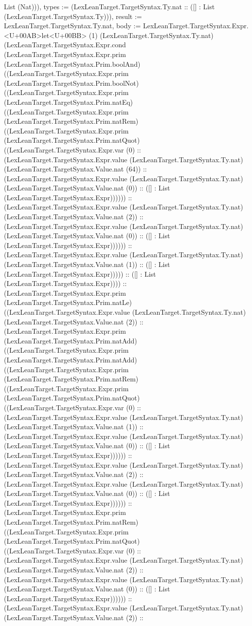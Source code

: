 \documentclass[11pt]{article}
\begin{document}
List (Nat))), types := (LexLeanTarget.TargetSyntax.Ty.nat :: ([] : List (LexLeanTarget.TargetSyntax.Ty))), result := LexLeanTarget.TargetSyntax.Ty.nat, body := LexLeanTarget.TargetSyntax.Expr.<U+00AB>let<U+00BB> (1) (LexLeanTarget.TargetSyntax.Ty.nat) (LexLeanTarget.TargetSyntax.Expr.cond (LexLeanTarget.TargetSyntax.Expr.prim (LexLeanTarget.TargetSyntax.Prim.boolAnd) ((LexLeanTarget.TargetSyntax.Expr.prim (LexLeanTarget.TargetSyntax.Prim.boolNot) ((LexLeanTarget.TargetSyntax.Expr.prim (LexLeanTarget.TargetSyntax.Prim.natEq) ((LexLeanTarget.TargetSyntax.Expr.prim (LexLeanTarget.TargetSyntax.Prim.natRem) ((LexLeanTarget.TargetSyntax.Expr.prim (LexLeanTarget.TargetSyntax.Prim.natQuot) ((LexLeanTarget.TargetSyntax.Expr.var (0) :: (LexLeanTarget.TargetSyntax.Expr.value (LexLeanTarget.TargetSyntax.Ty.nat) (LexLeanTarget.TargetSyntax.Value.nat (64)) :: (LexLeanTarget.TargetSyntax.Expr.value (LexLeanTarget.TargetSyntax.Ty.nat) (LexLeanTarget.TargetSyntax.Value.nat (0)) :: ([] : List (LexLeanTarget.TargetSyntax.Expr)))))) :: (LexLeanTarget.TargetSyntax.Expr.value (LexLeanTarget.TargetSyntax.Ty.nat) (LexLeanTarget.TargetSyntax.Value.nat (2)) :: (LexLeanTarget.TargetSyntax.Expr.value (LexLeanTarget.TargetSyntax.Ty.nat) (LexLeanTarget.TargetSyntax.Value.nat (0)) :: ([] : List (LexLeanTarget.TargetSyntax.Expr)))))) :: (LexLeanTarget.TargetSyntax.Expr.value (LexLeanTarget.TargetSyntax.Ty.nat) (LexLeanTarget.TargetSyntax.Value.nat (1)) :: ([] : List (LexLeanTarget.TargetSyntax.Expr))))) :: ([] : List (LexLeanTarget.TargetSyntax.Expr)))) :: (LexLeanTarget.TargetSyntax.Expr.prim (LexLeanTarget.TargetSyntax.Prim.natLe) ((LexLeanTarget.TargetSyntax.Expr.value (LexLeanTarget.TargetSyntax.Ty.nat) (LexLeanTarget.TargetSyntax.Value.nat (2)) :: (LexLeanTarget.TargetSyntax.Expr.prim (LexLeanTarget.TargetSyntax.Prim.natAdd) ((LexLeanTarget.TargetSyntax.Expr.prim (LexLeanTarget.TargetSyntax.Prim.natAdd) ((LexLeanTarget.TargetSyntax.Expr.prim (LexLeanTarget.TargetSyntax.Prim.natRem) ((LexLeanTarget.TargetSyntax.Expr.prim (LexLeanTarget.TargetSyntax.Prim.natQuot) ((LexLeanTarget.TargetSyntax.Expr.var (0) :: (LexLeanTarget.TargetSyntax.Expr.value (LexLeanTarget.TargetSyntax.Ty.nat) (LexLeanTarget.TargetSyntax.Value.nat (1)) :: (LexLeanTarget.TargetSyntax.Expr.value (LexLeanTarget.TargetSyntax.Ty.nat) (LexLeanTarget.TargetSyntax.Value.nat (0)) :: ([] : List (LexLeanTarget.TargetSyntax.Expr)))))) :: (LexLeanTarget.TargetSyntax.Expr.value (LexLeanTarget.TargetSyntax.Ty.nat) (LexLeanTarget.TargetSyntax.Value.nat (2)) :: (LexLeanTarget.TargetSyntax.Expr.value (LexLeanTarget.TargetSyntax.Ty.nat) (LexLeanTarget.TargetSyntax.Value.nat (0)) :: ([] : List (LexLeanTarget.TargetSyntax.Expr)))))) :: (LexLeanTarget.TargetSyntax.Expr.prim (LexLeanTarget.TargetSyntax.Prim.natRem) ((LexLeanTarget.TargetSyntax.Expr.prim (LexLeanTarget.TargetSyntax.Prim.natQuot) ((LexLeanTarget.TargetSyntax.Expr.var (0) :: (LexLeanTarget.TargetSyntax.Expr.value (LexLeanTarget.TargetSyntax.Ty.nat) (LexLeanTarget.TargetSyntax.Value.nat (2)) :: (LexLeanTarget.TargetSyntax.Expr.value (LexLeanTarget.TargetSyntax.Ty.nat) (LexLeanTarget.TargetSyntax.Value.nat (0)) :: ([] : List (LexLeanTarget.TargetSyntax.Expr)))))) :: (LexLeanTarget.TargetSyntax.Expr.value (LexLeanTarget.TargetSyntax.Ty.nat) (LexLeanTarget.TargetSyntax.Value.nat (2)) :: 
\end{document}
